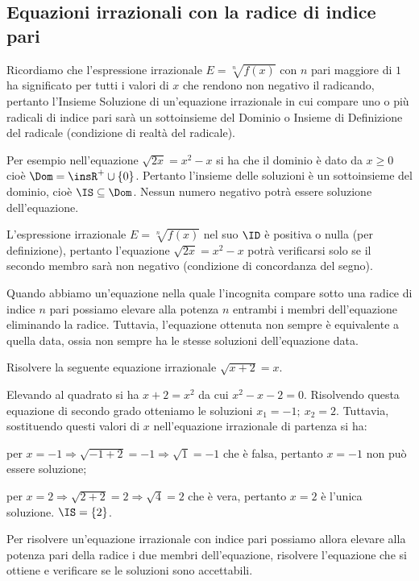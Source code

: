 \subsection{Equazioni irrazionali con la radice di indice pari}
Ricordiamo che l’espressione irrazionale $E=\sqrt[n]{f(x)}$ con $n$ pari maggiore di $1$ ha significato per tutti i valori di $x$ che rendono non negativo il radicando, pertanto l’Insieme Soluzione di un’equazione irrazionale in cui compare uno o più radicali di indice pari sarà un sottoinsieme del Dominio o Insieme di Definizione del radicale (condizione di realtà del radicale).

Per esempio nell’equazione $\sqrt{2x}=x^2-x$ si ha che il dominio è dato da $x\ge 0$ cioè $\Dom=\insR^+\cup \{0\}$. Pertanto l'insieme delle soluzioni è un sottoinsieme del dominio, cioè $\IS\subseteq \Dom$. Nessun numero negativo potrà essere soluzione dell’equazione.

L’espressione irrazionale $E=\sqrt[n]{f(x)}$ nel suo $ \ID $ è positiva o nulla (per definizione), pertanto l’equazione $\sqrt{2x}=x^2-x$ potrà verificarsi solo se il secondo membro sarà non negativo (condizione di concordanza del segno).

Quando abbiamo un'equazione nella quale l'incognita compare sotto una radice di indice $n$ pari possiamo elevare alla potenza $n$ entrambi i membri dell'equazione eliminando la radice. Tuttavia, l'equazione ottenuta non sempre è equivalente a quella data, ossia non sempre ha le stesse soluzioni dell'equazione data.

\begin{exrig}
\begin{esempio}
Risolvere la seguente equazione irrazionale $ \sqrt{x+2}=x $.

Elevando al quadrato si ha $x+2=x^2$ da cui $x^2-x-2=0$. Risolvendo questa equazione di secondo grado otteniamo le soluzioni $x_1=-1;\ x_2=2$. Tuttavia, sostituendo questi valori di $x$ nell'equazione irrazionale di partenza si ha:

per $x=-1 \Rightarrow \sqrt{-1+2}=-1 \Rightarrow \sqrt 1=-1$ che è falsa, pertanto $x=-1$ non può essere soluzione;

per $x=2 \Rightarrow \sqrt{2+2}=2 \Rightarrow \sqrt 4=2$ che è vera, pertanto $x=2$ è l'unica soluzione. $\IS=\{2\}$.
\end{esempio}
\end{exrig}

\conclusione Per risolvere un'equazione irrazionale con indice pari possiamo allora elevare alla potenza pari della radice i due membri dell'equazione, risolvere l'equazione che si ottiene e verificare se le soluzioni sono accettabili.

